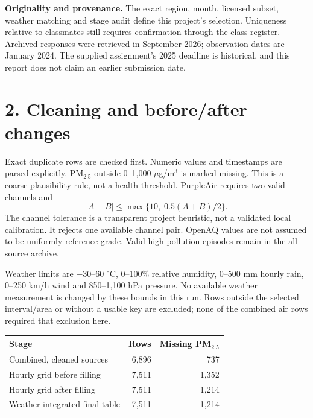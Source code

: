 \documentclass[11pt,a4paper]{article}
\begin{document}
\textbf{Originality and provenance.} The exact region, month, licensed subset, weather matching and stage audit define this project's selection. Uniqueness relative to classmates still requires confirmation through the class register. Archived responses were retrieved in September 2026; observation dates are January 2024. The supplied assignment's 2025 deadline is historical, and this report does not claim an earlier submission date.

\newpage
\section*{2. Cleaning and before/after changes}
Exact duplicate rows are checked first. Numeric values and timestamps are parsed explicitly. PM$_{2.5}$ outside 0--1,000 $\mu$g/m$^3$ is marked missing. This is a coarse plausibility rule, not a health threshold. PurpleAir requires two valid channels and
\[
 |A-B|\leq\max\{10,\;0.5(A+B)/2\}.
\]
The channel tolerance is a transparent project heuristic, not a validated local calibration. It rejects one available channel pair. OpenAQ values are not assumed to be uniformly reference-grade. Valid high pollution episodes remain in the all-source archive.

Weather limits are $-30$--60 $^\circ$C, 0--100\% relative humidity, 0--500 mm hourly rain, 0--250 km/h wind and 850--1,100 hPa pressure. No available weather measurement is changed by these bounds in this run. Rows outside the selected interval/area or without a usable key are excluded; none of the combined air rows required that exclusion here.

\begin{center}\begin{tabular}{lrr}\toprule
Stage & Rows & Missing PM$_{2.5}$ \\\midrule
Combined, cleaned sources & 6,896 & 737 \\
Hourly grid before filling & 7,511 & 1,352 \\
Hourly grid after filling & 7,511 & 1,214 \\
Weather-integrated final table & 7,511 & 1,214 \\\bottomrule
\end{tabular}\end{center}
\end{document}
